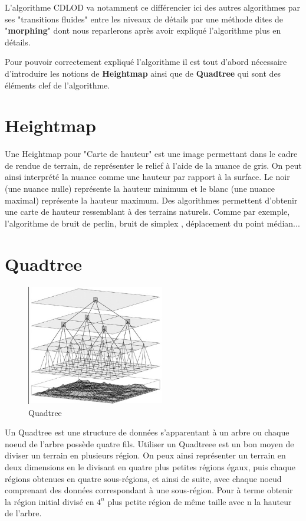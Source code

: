  L'algorithme CDLOD va notamment ce différencier ici des autres algorithmes par ses "transitions fluides" entre les niveaux de détails par une méthode dites de "\textbf{morphing}" dont nous reparlerons après avoir expliqué l'algorithme plus en détails.
 
 Pour pouvoir correctement expliqué l'algorithme il est tout d'abord nécessaire d'introduire les notions de  \textbf{Heightmap} ainsi que de \textbf{Quadtree} qui sont des éléments clef de l'algorithme.
 
  \section{Heightmap}
  
  Une Heightmap pour "Carte de hauteur" est une image permettant dans le cadre de rendue de terrain, de représenter le relief à l'aide de la nuance de gris. On peut ainsi interprété la nuance comme une hauteur par rapport à la surface. Le noir (une nuance nulle) représente la hauteur minimum et le blanc (une nuance maximal) représente la hauteur maximum. Des algorithmes permettent d'obtenir une carte de hauteur ressemblant à des terrains naturels. Comme par exemple, l'algorithme de bruit de perlin, bruit de simplex , déplacement du point médian...
  
  
  \section{Quadtree}
  
\begin{figure}
 \includegraphics[width=6cm]{img/quadtree.png}
   \caption[Quadtree]{Quadtree\protect\footnotemark}
   \label{fig:quadtree-img}
 \end{figure}
  
 Un Quadtree est une structure de données s'apparentant à un arbre ou chaque noeud de l'arbre possède quatre fils. Utiliser un Quadtreee est un bon moyen de diviser un terrain en plusieurs région. On peux ainsi représenter un terrain en deux dimensions en le divisant en quatre plus petites régions égaux, puis chaque régions obtenues en quatre sous-régions, et ainsi de suite, avec chaque noeud comprenant des données correspondant à une sous-région. Pour à terme obtenir la région initial divisé en \begin{math}{4^n}\end{math} plus petite région de même taille avec n la hauteur de l'arbre.

